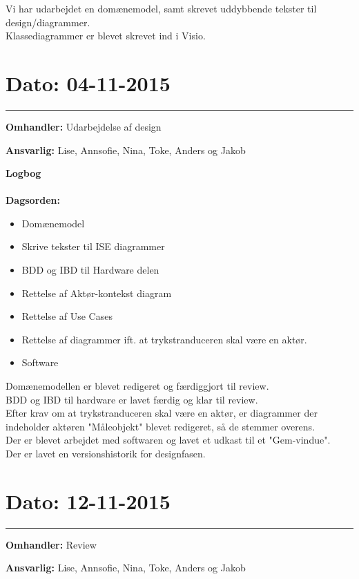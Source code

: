 Vi har udarbejdet en domænemodel, samt skrevet uddybbende tekster til design/diagrammer. \\
Klassediagrammer er blevet skrevet ind i Visio. 




\section{Dato: 04-11-2015 }
\hrule

\textbf{Omhandler:} Udarbejdelse af design  

\textbf{Ansvarlig:} Lise, Annsofie, Nina, Toke, Anders og Jakob

\textbf{Logbog}
\\
\\
\textbf{Dagsorden:}
\begin{itemize}
	\item Domænemodel
	\item Skrive tekster til ISE diagrammer
	\item BDD og IBD til Hardware delen
	\item Rettelse af Aktør-kontekst diagram
	\item Rettelse af Use Cases
	\item Rettelse af diagrammer ift. at trykstranduceren skal være en aktør.
	\item Software
\end{itemize}

Domænemodellen er blevet redigeret og færdiggjort til review.\\
BDD og IBD til hardware er lavet færdig og klar til review.\\
Efter krav om at trykstranduceren skal være en aktør, er diagrammer der indeholder aktøren "Måleobjekt" blevet redigeret, så de stemmer overens.\\
Der er blevet arbejdet med softwaren og lavet et udkast til et "Gem-vindue".\\
Der er lavet en versionshistorik for designfasen.




\section{Dato: 12-11-2015 }
\hrule

\textbf{Omhandler:} Review 

\textbf{Ansvarlig:} Lise, Annsofie, Nina, Toke, Anders og Jakob


